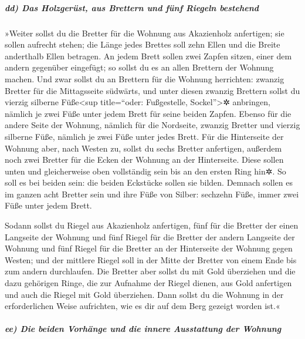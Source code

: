 \hypertarget{dd-das-holzgeruxfcst-aus-brettern-und-fuxfcnf-riegeln-bestehend}{%
\subparagraph{dd) Das Holzgerüst, aus Brettern und fünf Riegeln
bestehend}\label{dd-das-holzgeruxfcst-aus-brettern-und-fuxfcnf-riegeln-bestehend}}

 »Weiter sollst du die Bretter für die Wohnung aus
Akazienholz anfertigen; sie sollen aufrecht stehen;  die
Länge jedes Brettes soll zehn Ellen und die Breite anderthalb Ellen
betragen.  An jedem Brett sollen zwei Zapfen sitzen,
einer dem andern gegenüber eingefügt; so sollst du es an allen Brettern
der Wohnung machen.  Und zwar sollst du an Brettern für
die Wohnung herrichten: zwanzig Bretter für die Mittagsseite südwärts,
 und unter diesen zwanzig Brettern sollst du vierzig
silberne Füße\textless sup title=``oder: Fußgestelle,
Sockel''\textgreater✲ anbringen, nämlich je zwei Füße unter jedem Brett
für seine beiden Zapfen.  Ebenso für die andere Seite der
Wohnung, nämlich für die Nordseite, zwanzig Bretter  und
vierzig silberne Füße, nämlich je zwei Füße unter jedes Brett.
 Für die Hinterseite der Wohnung aber, nach Westen zu,
sollst du sechs Bretter anfertigen,  außerdem noch zwei
Bretter für die Ecken der Wohnung an der Hinterseite. 
Diese sollen unten und gleicherweise oben vollständig sein bis an den
ersten Ring hin✲. So soll es bei beiden sein: die beiden Eckstücke
sollen sie bilden.  Demnach sollen es im ganzen acht
Bretter sein und ihre Füße von Silber: sechzehn Füße, immer zwei Füße
unter jedem Brett.

 Sodann sollst du Riegel aus Akazienholz anfertigen, fünf
für die Bretter der einen Langseite der Wohnung  und fünf
Riegel für die Bretter der andern Langseite der Wohnung und fünf Riegel
für die Bretter an der Hinterseite der Wohnung gegen Westen;
 und der mittlere Riegel soll in der Mitte der Bretter
von einem Ende bis zum andern durchlaufen.  Die Bretter
aber sollst du mit Gold überziehen und die dazu gehörigen Ringe, die zur
Aufnahme der Riegel dienen, aus Gold anfertigen und auch die Riegel mit
Gold überziehen.  Dann sollst du die Wohnung in der
erforderlichen Weise aufrichten, wie es dir auf dem Berg gezeigt worden
ist.«

\hypertarget{ee-die-beiden-vorhuxe4nge-und-die-innere-ausstattung-der-wohnung}{%
\subparagraph{ee) Die beiden Vorhänge und die innere Ausstattung der
Wohnung}\label{ee-die-beiden-vorhuxe4nge-und-die-innere-ausstattung-der-wohnung}}

